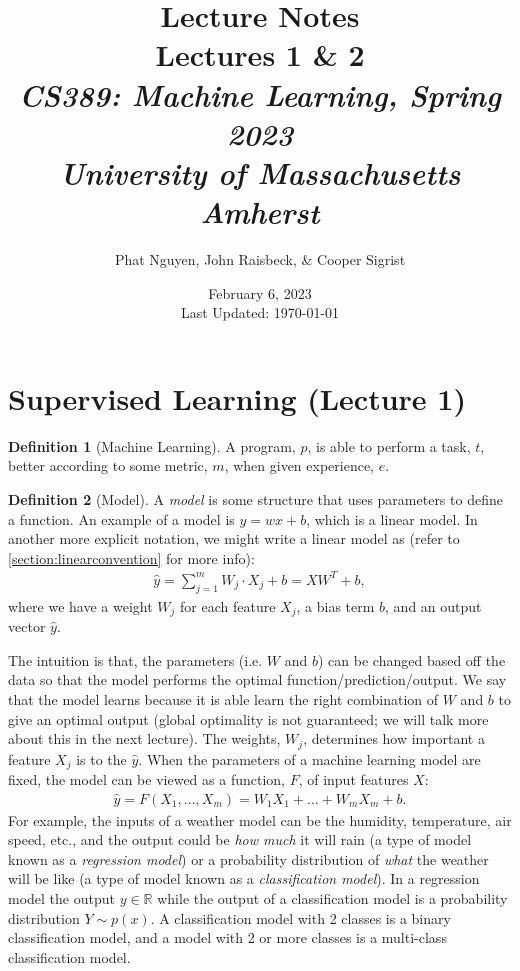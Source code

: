 \documentclass[11pt]{article}
\numberwithin{equation}{section}
\theoremstyle{definition}%
\newtheorem{definition}{Definition}[section]%
\begin{document}
\title{Lecture Notes\\\vspace{1ex}
\large Lectures 1 \& 2\\
\normalsize \emph{CS389: Machine Learning, Spring 2023}\\
\emph{University of Massachusetts Amherst}}
\author{\smallheader Phat Nguyen, John Raisbeck, \& Cooper Sigrist}
\date{\smallheader February 6, 2023\\
Last Updated: \today}
\maketitle


\section{Supervised Learning (Lecture 1)}
\begin{definition}[Machine Learning]
    A program, $p$, is able to perform a task, $t$, better according to some metric, $m$, when given experience, $e$.
\end{definition}
\begin{definition}[Model]
A \emph{model} is some structure that uses parameters to define a function. An example of a model is $y= wx + b$, which is a linear model. In another more explicit notation, we might write a linear model as (refer to \autoref{section:linearconvention} for more info):
\begin{align}
    \hat{y} = \sum_{j=1}^{m}{W_j \cdot X_j + b} = XW^{T} + b,
\end{align}
where we have a weight $W_j$ for each feature $X_j$, a bias term $b$, and an output vector $\hat{y}$. 
\end{definition}

The intuition is that, the parameters (i.e. $W$ and $b$) can be changed based off the data so that the model performs the optimal function/prediction/output. We say that the model learns because it is able learn the right combination of $W$ and $b$ to give an optimal output (global optimality is not guaranteed; we will talk more about this in the next lecture). The weights, $W_j$, determines how important a feature $X_j$ is to the $\hat{y}$. When the parameters of a machine learning model are fixed, the model can be viewed as a function, $F$, of input features $X$:
\begin{align}
    \hat{y} = F(X_1, ..., X_m) = W_1 X_1 + ... + W_m X_m + b.
\end{align}
For example, the inputs of a weather model can be the humidity, temperature, air speed, etc., and the output could be \emph{how much} it will rain (a type of model known as a \emph{regression model}) or a probability distribution of \emph{what} the weather will be like (a type of model known as a \emph{classification model}). In a regression model the output $y \in \mathbb{R}$ while the output of a classification model is a probability distribution $Y \sim p(x)$. A classification model with 2 classes is a binary classification model, and a model with 2 or more classes is a multi-class classification model.
\end{document}
